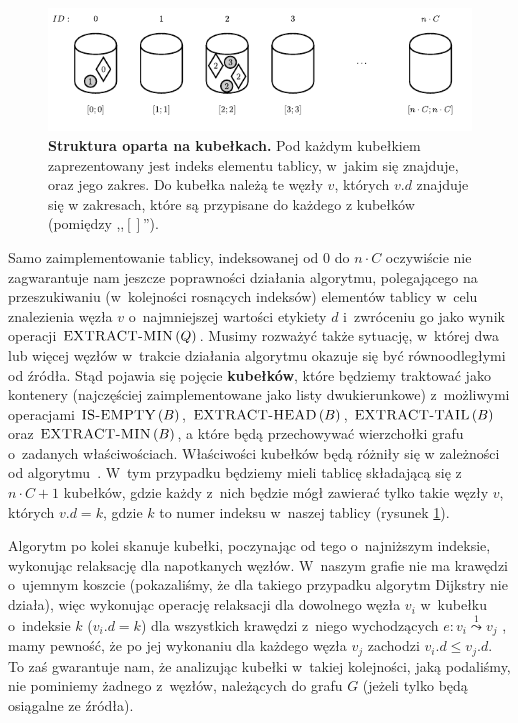 \begin{figure}[!htbp]
	\centering
	\includegraphics[width=\textwidth]{Chapter_II/SIMPLE-BUCKET-Example/a.pdf}
	\caption{ \textbf{Struktura oparta na kubełkach.} Pod każdym kubełkiem zaprezentowany jest indeks elementu tablicy, w~jakim się znajduje, oraz jego zakres. Do kubełka należą te węzły $v$, których $v.d$ znajduje się w zakresach, które są przypisane do każdego z kubełków (pomiędzy ,,$ \left[ \right]$''). } \label{fig:exampleSimpleBucket}
\end{figure}

Samo zaimplementowanie tablicy, indeksowanej od $0$ do $n \cdot C$ oczywiście nie zagwarantuje nam jeszcze poprawności działania algorytmu, polegającego na przeszukiwaniu (w~kolejności rosnących indeksów) elementów tablicy w~celu znalezienia węzła $v$ o~najmniejszej wartości etykiety $d$ i~zwróceniu go jako wynik operacji $\textrm{\textsc{EXTRACT-MIN}} \left( Q \right)$. Musimy rozważyć także sytuację, w~której dwa lub więcej węzłów w~trakcie działania algorytmu okazuje się być równoodległymi od źródła. Stąd pojawia się pojęcie \textbf{kubełków}, które będziemy traktować jako kontenery (najczęściej zaimplementowane jako listy dwukierunkowe) z~możliwymi operacjami $\textrm{\textsc{IS-EMPTY}} \left( B \right)$, $\textrm{\textsc{EXTRACT-HEAD}} \left( B \right)$, $\textrm{\textsc{EXTRACT-TAIL}} \left( B \right)$ oraz $\textrm{\textsc{EXTRACT-MIN}} \left( B \right)$, a które będą przechowywać wierzchołki grafu o~zadanych właściwościach. Właściwości kubełków będą różniły się w zależności od algorytmu~\cite[$79$--$81$]{GIDA}. W~tym przypadku będziemy mieli tablicę składającą się z~$n \cdot C + 1$ kubełków, gdzie każdy z~nich będzie mógł zawierać tylko takie węzły $v$, których $v.d = k$, gdzie $k$ to numer indeksu w~naszej tablicy (rysunek \ref{fig:exampleSimpleBucket}). 

Algorytm po kolei skanuje kubełki, poczynając od tego o~najniższym indeksie, wykonując relaksację dla napotkanych węzłów. W~naszym grafie nie ma krawędzi o~ujemnym koszcie (pokazaliśmy, że dla takiego przypadku algorytm Dijkstry nie działa), więc wykonując operację relaksacji dla dowolnego węzła $v_{i}$ w~kubełku o~indeksie $k$ ($v_{i}.d = k$) dla wszystkich krawędzi z~niego wychodzących $e : v_{i} \overset{1}\leadsto v_{j}$ , mamy pewność, że po jej wykonaniu dla każdego węzła $v_{j}$ zachodzi $v_{i}.d \leqslant v_{j}.d$. To zaś gwarantuje nam, że analizując kubełki w~takiej kolejności, jaką podaliśmy, nie pominiemy żadnego z~węzłów, należących do grafu $G$ (jeżeli tylko będą osiągalne ze źródła).

